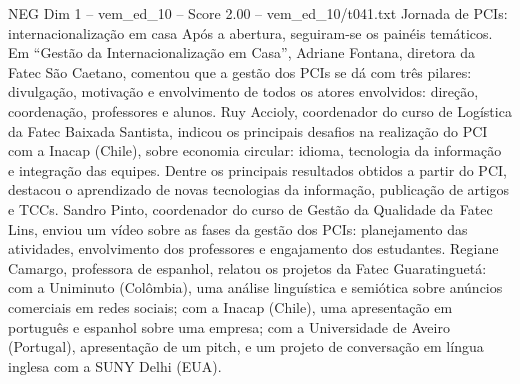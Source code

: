\begin{textsample}{NEG Dim 1 – vem\_ed\_10 – Score 2.00 – vem\_ed\_10/t041.txt}  \label{ex:f1_neg_069}
Jornada de PCIs: internacionalização em casa Após a abertura, seguiram-se os painéis temáticos.
Em “Gestão da Internacionalização em Casa”, Adriane Fontana, diretora da Fatec São Caetano, comentou que a gestão dos PCIs se dá com três pilares: divulgação, motivação e envolvimento de todos os atores envolvidos: direção, coordenação, professores e alunos.
Ruy Accioly, coordenador do curso de Logística da Fatec Baixada Santista, indicou os principais desafios na realização do PCI com a Inacap (Chile), sobre economia circular: idioma, tecnologia da informação e integração das equipes.
Dentre os principais resultados obtidos a partir do PCI, destacou o aprendizado de novas tecnologias da informação, publicação de artigos e TCCs.
Sandro Pinto, coordenador do curso de Gestão da Qualidade da Fatec Lins, enviou um vídeo sobre as fases da gestão dos PCIs: planejamento das atividades, envolvimento dos professores e engajamento dos estudantes.
Regiane Camargo, professora de espanhol, relatou os projetos da Fatec Guaratinguetá: com a Uniminuto (Colômbia), uma análise linguística e semiótica sobre anúncios comerciais em redes sociais; com a Inacap (Chile), uma apresentação em português e espanhol sobre uma empresa; com a Universidade de Aveiro (Portugal), apresentação de um pitch, e um projeto de conversação em língua inglesa com a SUNY Delhi (EUA).

\end{textsample}
